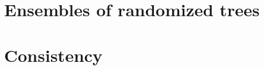 


\section{Ensembles of randomized trees}
\label{sec:4:ensemble}







\section{Consistency}
\label{sec:4:consistency}

